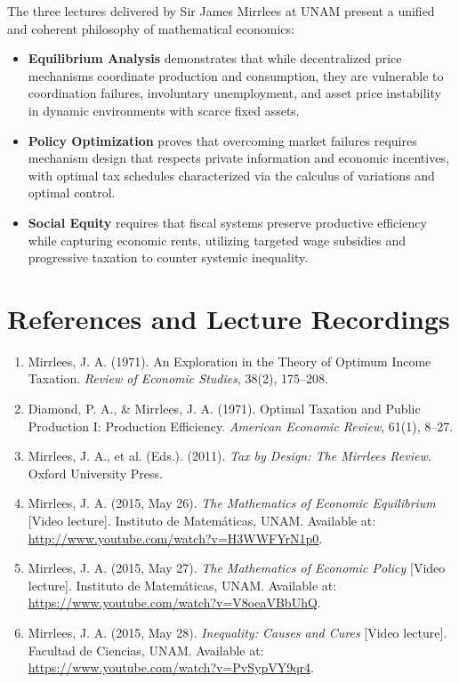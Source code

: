 \documentclass[11pt,a4paper]{article}
\begin{document}
The three lectures delivered by Sir James Mirrlees at UNAM present a unified and coherent philosophy of mathematical economics:
\begin{itemize}
    \item \textbf{Equilibrium Analysis} demonstrates that while decentralized price mechanisms coordinate production and consumption, they are vulnerable to coordination failures, involuntary unemployment, and asset price instability in dynamic environments with scarce fixed assets.
    \item \textbf{Policy Optimization} proves that overcoming market failures requires mechanism design that respects private information and economic incentives, with optimal tax schedules characterized via the calculus of variations and optimal control.
    \item \textbf{Social Equity} requires that fiscal systems preserve productive efficiency while capturing economic rents, utilizing targeted wage subsidies and progressive taxation to counter systemic inequality.
\end{itemize}

\section*{References and Lecture Recordings}
\begin{enumerate}
    \item Mirrlees, J. A. (1971). An Exploration in the Theory of Optimum Income Taxation. \textit{Review of Economic Studies}, 38(2), 175--208.
    \item Diamond, P. A., \& Mirrlees, J. A. (1971). Optimal Taxation and Public Production I: Production Efficiency. \textit{American Economic Review}, 61(1), 8--27.
    \item Mirrlees, J. A., et al. (Eds.). (2011). \textit{Tax by Design: The Mirrlees Review}. Oxford University Press.
    \item Mirrlees, J. A. (2015, May 26). \textit{The Mathematics of Economic Equilibrium} [Video lecture]. Instituto de Matemáticas, UNAM. Available at: \url{http://www.youtube.com/watch?v=H3WWFYrN1p0}.
    \item Mirrlees, J. A. (2015, May 27). \textit{The Mathematics of Economic Policy} [Video lecture]. Instituto de Matemáticas, UNAM. Available at: \url{https://www.youtube.com/watch?v=V8oeaVBbUhQ}.
    \item Mirrlees, J. A. (2015, May 28). \textit{Inequality: Causes and Cures} [Video lecture]. Facultad de Ciencias, UNAM. Available at: \url{https://www.youtube.com/watch?v=PvSypVY9qr4}.
\end{enumerate}
\end{document}
